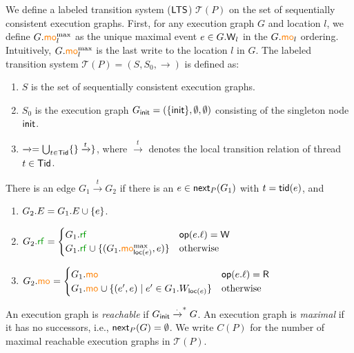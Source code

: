 We define a labeled transition system ($\mathsf{LTS}$) $\mathcal{T}(P)$ on the set of sequentially consistent execution graphs.  
First, for any execution graph $G$ and location $l$, we define $G.{\textcolor{orange}{\mathsf{mo}}^{\max}_{l}}$ as the unique maximal event $e \in G.\mathsf{W}_l$ in the $G.{\textcolor{orange}{\mathsf{mo}}_{l}}$ ordering.
Intuitively, $G.{\textcolor{orange}{\mathsf{mo}}^{\max}_{l}}$ is the last write to the location $l$ in $G$. 
The labeled transition system $\mathcal{T}(P) = (S, S_0, \xrightarrow{})$ is defined as:
\begin{enumerate}
    \item $S$ is the set of sequentially consistent execution graphs.
    \item $S_0$ is the execution graph $G_{\mathsf{init}} = ({\{ \mathsf{init} \}}, \emptyset, \emptyset)$ consisting of the singleton node $\mathsf{init}$.
    \item $\xrightarrow{} = \bigcup_{t \in \mathsf{Tid}}\{\}\xrightarrow{t}\}$, where $\xrightarrow{t}$ denotes the local transition relation of thread $t \in \mathsf{Tid}$.  
\end{enumerate}
There is an edge $G_1 \xrightarrow{t} G_2$ if
there is an $e\in \mathsf{next}_P(G_1)$ with $t = \mathsf{tid}(e)$, and
\begin{enumerate} 
\item $G_2.E = G_1.E \cup {\{ e \}}$.
\item $G_2.\rf{} = \begin{cases} 
G_1.\rf{} & \op(e.\ell) = \opw \\ 
G_1.\rf{} \cup \{(G_1.\momax{\loc(e)}, e)\} & \text{otherwise} 
\end{cases}$
\item $G_2.{\textcolor{orange}{\mathsf{mo}}_{}}{} = \begin{cases} 
G_1.{\textcolor{orange}{\mathsf{mo}}_{}}{} & \mathsf{op}(e.\ell) = \mathsf{R} \\ 
G_1.{\textcolor{orange}{\mathsf{mo}}_{}} \cup \{(e', e) \mid e' \in G_1.W_{\mathsf{loc}(e)}\} & \text{otherwise} 
\end{cases}$
\end{enumerate}
%
An execution graph is \emph{reachable} if $G_{\mathsf{init}} \xrightarrow{\cdot}^* G$.
An execution graph is \emph{maximal} if it has no successors,
i.e., $\mathsf{next}_P(G) = \emptyset$.
We write $C(P)$ for the number of maximal reachable execution graphs in $\mathcal{T}(P)$.
%

